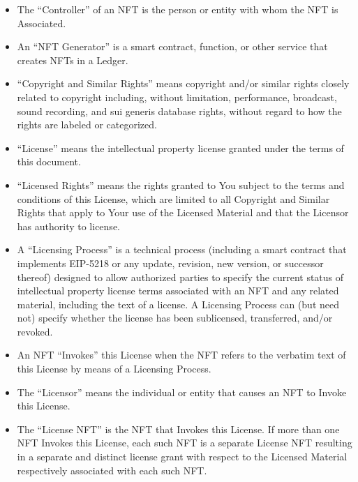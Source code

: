 \documentclass{article}
\newcommand{\eiplicense}{EIP-5218\xspace}
\newcommand{\subsect}[1]{\vspace{12pt}\noindent{\em{#1}}}
\begin{document}
\begin{sffamily}
\begin{itemize}
	\item The ``Controller'' of an NFT is the person or entity with whom the NFT is Associated.
	
	\item An ``NFT Generator'' is a smart contract, function, or other service that creates NFTs in a Ledger.

	\end{itemize}

	\subsect{Licensing}

	\begin{itemize}	
	\item	``Copyright and Similar Rights'' means copyright and/or similar rights closely related to copyright including, without limitation, performance, broadcast, sound recording, and sui generis database rights, without regard to how the rights are labeled or categorized.

	\item	``License'' means the intellectual property license granted under the terms of this document.
		
	\item	``Licensed Rights'' means the rights granted to You subject to the terms and conditions of this License, which are limited to all Copyright and Similar Rights that apply to Your use of the Licensed Material and that the Licensor has authority to license.

	\item	A ``Licensing Process'' is a technical process (including a smart contract that implements \eiplicense or any update, revision, new version, or successor thereof) designed to allow authorized parties to specify the current status of intellectual property license terms associated with an NFT and any related material, including the text of a license. A Licensing Process can (but need not) specify whether the license has been sublicensed, transferred, and/or revoked.

	\item	An NFT ``Invokes'' this License when the NFT refers to the verbatim text of this License by means of a Licensing Process.
		
	\item	The ``Licensor'' means the individual or entity that causes an NFT to Invoke this License.
		
	\item	The ``License NFT'' is the NFT that Invokes this License. If more than one NFT Invokes this License, each such NFT is a separate License NFT resulting in a separate and distinct license grant with respect to the Licensed Material respectively associated with each such NFT.
		

\end{itemize}
\end{sffamily}
\end{document}
